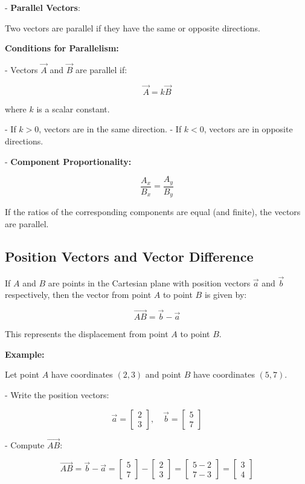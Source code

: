 \documentclass{article}
\begin{document}
\begin{multicols}{2}
- \textbf{Parallel Vectors}:

  Two vectors are parallel if they have the same or opposite directions.

  \textbf{Conditions for Parallelism:}

  - Vectors $\vec{A}$ and $\vec{B}$ are parallel if:

    \[
    \vec{A} = k \vec{B}
    \]

    where $ k $ is a scalar constant.

    - If $ k > 0 $, vectors are in the same direction.
    - If $ k < 0 $, vectors are in opposite directions.

  - \textbf{Component Proportionality:}

    \[
    \frac{A_x}{B_x} = \frac{A_y}{B_y}
    \]

    If the ratios of the corresponding components are equal (and finite), the vectors are parallel.

\subsection*{Position Vectors and Vector Difference}

If $ A $ and $ B $ are points in the Cartesian plane with position vectors $ \vec{a} $ and $ \vec{b} $ respectively, then the vector from point $ A $ to point $ B $ is given by:

\[
\vec{AB} = \vec{b} - \vec{a}
\]

This represents the displacement from point $ A $ to point $ B $.

\textbf{Example:}

Let point $ A $ have coordinates $ (2, 3) $ and point $ B $ have coordinates $ (5, 7) $.

- Write the position vectors:

  \[
  \vec{a} = \begin{bmatrix} 2 \\ 3 \end{bmatrix}, \quad \vec{b} = \begin{bmatrix} 5 \\ 7 \end{bmatrix}
  \]

- Compute $ \vec{AB} $:

  \[
  \vec{AB} = \vec{b} - \vec{a} = \begin{bmatrix} 5 \\ 7 \end{bmatrix} - \begin{bmatrix} 2 \\ 3 \end{bmatrix} = \begin{bmatrix} 5 - 2 \\ 7 - 3 \end{bmatrix} = \begin{bmatrix} 3 \\ 4 \end{bmatrix}
  \]


\end{multicols}
\end{document}
